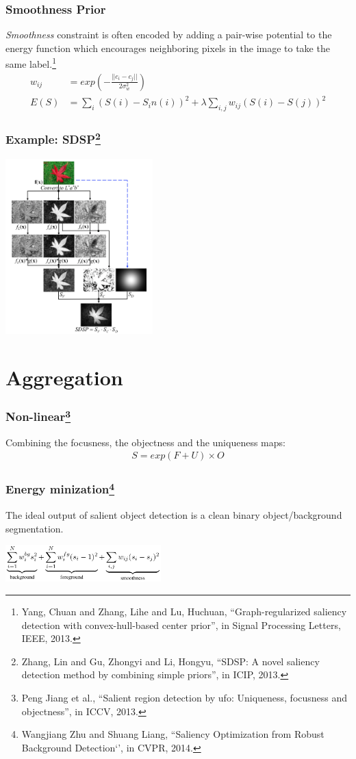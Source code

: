 \documentclass[notheorems,serif,table,compress]{beamer}  %
\begin{document}
\begin{frame}
\frametitle{Smoothness Prior}
{\color{blue}\emph{Smoothness}} constraint is often encoded by adding a pair-wise potential to the energy function which encourages neighboring pixels in the image to take the same label.\footnote{Yang, Chuan and Zhang, Lihe and Lu, Huchuan, ``Graph-regularized saliency detection with convex-hull-based center prior'', in Signal Processing Letters, IEEE, 2013.}
\begin{align}
w_{ij} & = exp\left(-\frac{||c_i-c_j||}{2\sigma_w^2}\right)\\
E(S) & = \sum_{i}(S(i)-S_in(i))^2+\lambda \sum_{i, j}w_{ij}(S(i)-S(j))^2
\end{align}
\end{frame}


\begin{frame}
\frametitle{Example: SDSP\footnote{Zhang, Lin and Gu, Zhongyi and Li, Hongyu, ``SDSP: A novel saliency detection method by combining simple priors'', in ICIP, 2013.}}

\centering\includegraphics[width=5.7cm]{SDSP}
\end{frame}


\section{Aggregation}

\begin{frame}
\frametitle{Non-linear\footnote{Peng Jiang et al., ``Salient region detection by ufo: Uniqueness, focusness and objectness'', in ICCV, 2013. }}
Combining the focusness, the objectness and the uniqueness maps:
\begin{align}
S = exp( F + U) \times O
\end{align}
\end{frame}


\begin{frame}
\frametitle{Energy minization\footnote{Wangjiang Zhu and Shuang Liang, ``Saliency Optimization from Robust Background Detection‘’, in CVPR, 2014.}}
The ideal output of salient object detection is a clean binary object/background segmentation.

\centering\includegraphics[width=6cm]{optimization}
\end{frame}
\end{document}
